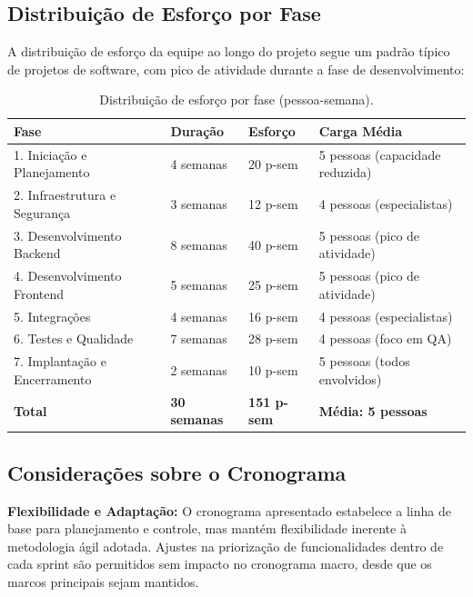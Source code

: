 \subsection{Distribuição de Esforço por Fase}

A distribuição de esforço da equipe ao longo do projeto segue um padrão típico de projetos de software, com pico de atividade durante a fase de desenvolvimento:

\begin{table}[H]
\centering
\caption{Distribuição de esforço por fase (pessoa-semana).}%
\label{tab:esforco}
\small
\begin{tabular}{|p{4.5cm}|p{2cm}|p{2.5cm}|p{4cm}|}
\hline
\textbf{Fase} & \textbf{Duração} & \textbf{Esforço} & \textbf{Carga Média} \\ \hline
1. Iniciação e Planejamento & 4 semanas & 20 p-sem & 5 pessoas (capacidade reduzida) \\ \hline
2. Infraestrutura e Segurança & 3 semanas & 12 p-sem & 4 pessoas (especialistas) \\ \hline
3. Desenvolvimento Backend & 8 semanas & 40 p-sem & 5 pessoas (pico de atividade) \\ \hline
4. Desenvolvimento Frontend & 5 semanas & 25 p-sem & 5 pessoas (pico de atividade) \\ \hline
5. Integrações & 4 semanas & 16 p-sem & 4 pessoas (especialistas) \\ \hline
6. Testes e Qualidade & 7 semanas & 28 p-sem & 4 pessoas (foco em QA) \\ \hline
7. Implantação e Encerramento & 2 semanas & 10 p-sem & 5 pessoas (todos envolvidos) \\ \hline
\textbf{Total} & \textbf{30 semanas} & \textbf{151 p-sem} & \textbf{Média: 5 pessoas} \\ \hline
\end{tabular}
\end{table}

\subsection{Considerações sobre o Cronograma}

\textbf{Flexibilidade e Adaptação:}
O cronograma apresentado estabelece a linha de base para planejamento e controle, mas mantém flexibilidade inerente à metodologia ágil adotada. Ajustes na priorização de funcionalidades dentro de cada sprint são permitidos sem impacto no cronograma macro, desde que os marcos principais sejam mantidos.

